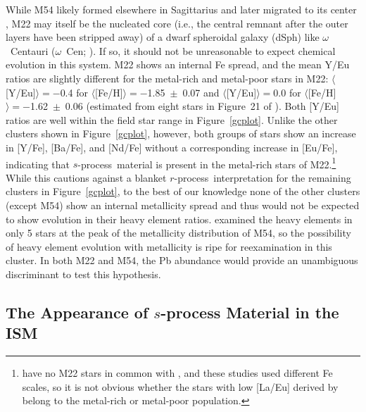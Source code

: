 \documentclass{emulateapj}
\def\rpro{\mbox{$r$-process}}
\def\spro{\mbox{$s$-process}}
\begin{document}
While M54 likely formed elsewhere in Sagittarius and later migrated
to its center \citep{bellazzini08,carretta10}, 
M22 may itself be the nucleated core (i.e., the central
remnant after the outer layers have been stripped away)
of a dwarf spheroidal galaxy (dSph) 
like $\omega$~Centauri ($\omega$~Cen; \citealt{dacosta09}).
If so, 
it should not be unreasonable to expect chemical evolution in this system.
M22 shows an internal Fe spread, 
and the mean Y/Eu ratios are slightly different for the 
metal-rich and metal-poor stars in M22:
$\langle$[Y/Eu]$\rangle = -$0.4 for 
$\langle$[Fe/H]$\rangle = -$1.85~$\pm$~0.07 and
$\langle$[Y/Eu]$\rangle = $0.0 for 
$\langle$[Fe/H]$\rangle = -$1.62~$\pm$~0.06
%
(estimated from eight stars in Figure~21 of \citealt{marino09}).
Both [Y/Eu] ratios are well within the field star range in 
Figure~\ref{gcplot}.
Unlike the other clusters shown in Figure~\ref{gcplot}, however,
both groups of stars show an increase in [Y/Fe], [Ba/Fe], and [Nd/Fe]
without a corresponding increase in [Eu/Fe], indicating that 
\spro\ material is present in the metal-rich stars of M22.\footnote{
\citet{marino09} have no M22 stars in common with \citet{brown92},
and these studies used different Fe scales, so it is not obvious
whether the stars with low [La/Eu] derived by \citet{brown92}
belong to the metal-rich or metal-poor population.} 
While this cautions against a blanket \rpro\ interpretation for
the remaining clusters in Figure~\ref{gcplot}, 
to the best of our knowledge none of the other clusters (except M54)
show an internal metallicity spread and thus would not be expected
to show evolution in their heavy element ratios.
\citet{brown99} examined the heavy elements in only 5 stars at the 
peak of the metallicity distribution of M54, so the possibility of
heavy element evolution with metallicity is ripe for reexamination 
in this cluster.
In both M22 and M54, the Pb abundance would provide an unambiguous 
discriminant to test this hypothesis.


\subsection{The Appearance of $s$-process Material in the ISM}
\label{risespro}
\end{document}
